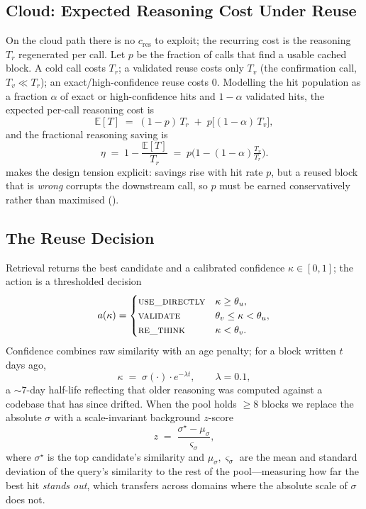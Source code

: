 \documentclass[10pt]{article}
\begin{document}
\subsection{Cloud: Expected Reasoning Cost Under Reuse}
On the cloud path there is no $c_{\text{res}}$ to exploit; the recurring cost is
the reasoning $T_r$ regenerated per call. Let $p$ be the fraction of calls that
find a usable cached block. A cold call costs $T_r$; a validated reuse costs only
$T_v$ (the confirmation call, $T_v \ll T_r$); an exact/high-confidence reuse
costs $0$. Modelling the hit population as a fraction $\alpha$ of exact or
high-confidence hits and $1-\alpha$ validated hits, the expected per-call
reasoning cost is
\begin{equation}
\mathbb{E}[T] \;=\; (1-p)\,T_r \;+\; p\big[(1-\alpha)\,T_v\big],
\label{eq:expected}
\end{equation}
and the fractional reasoning saving is
\begin{equation}
\eta \;=\; 1 - \frac{\mathbb{E}[T]}{T_r}
     \;=\; p\Big(1 - (1-\alpha)\tfrac{T_v}{T_r}\Big).
\label{eq:eta}
\end{equation}
 makes the design tension explicit: savings rise with hit rate $p$,
but a reused block that is \emph{wrong} corrupts the downstream call, so $p$ must
be earned conservatively rather than maximised ().

\subsection{The Reuse Decision}
Retrieval returns the best candidate and a calibrated confidence
$\kappa\!\in\![0,1]$; the action is a thresholded decision
\begin{equation}
a(\kappa)=
\begin{cases}
\textsc{use\_directly} & \kappa \ge \theta_u,\\
\textsc{validate} & \theta_v \le \kappa < \theta_u,\\
\textsc{re\_think} & \kappa < \theta_v.
\end{cases}
\label{eq:decision}
\end{equation}
Confidence combines raw similarity with an age penalty; for a block written
$t$ days ago,
\begin{equation}
\kappa \;=\; \sigma(\cdot)\cdot e^{-\lambda t}, \qquad \lambda = 0.1,
\label{eq:agedecay}
\end{equation}
a $\sim$7-day half-life reflecting that older reasoning was computed against a
codebase that has since drifted. When the pool holds $\ge\!8$ blocks we replace
the absolute $\sigma$ with a scale-invariant background $z$-score
\begin{equation}
z \;=\; \frac{\sigma^\star - \mu_\sigma}{\varsigma_\sigma},
\label{eq:zscore}
\end{equation}
where $\sigma^\star$ is the top candidate's similarity and $\mu_\sigma,
\varsigma_\sigma$ are the mean and standard deviation of the query's similarity
to the rest of the pool---measuring how far the best hit \emph{stands out},
which transfers across domains where the absolute scale of $\sigma$ does not.
\end{document}
